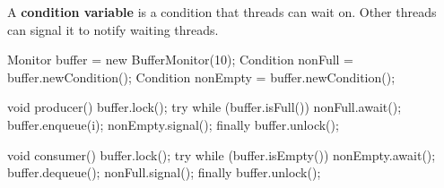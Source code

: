 \begin{definition}
A \textbf{condition variable} is a condition that threads can wait on. Other threads can signal it to notify waiting threads.
\end{definition}

\begin{codeexample}
Monitor buffer = new BufferMonitor(10);
Condition nonFull = buffer.newCondition();
Condition nonEmpty = buffer.newCondition();

void producer() {
    buffer.lock();
    try {
        while (buffer.isFull()) { nonFull.await(); }
        buffer.enqueue(i);
        nonEmpty.signal();
    } finally { buffer.unlock(); }
}

void consumer() {
    buffer.lock();
    try {
        while (buffer.isEmpty()) { nonEmpty.await(); }
        buffer.dequeue();
        nonFull.signal();
    } finally { buffer.unlock(); }
}
\end{codeexample}
